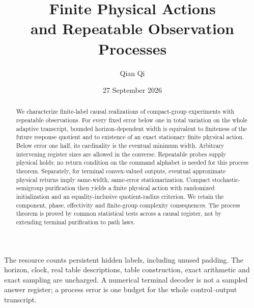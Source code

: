 \documentclass[11pt]{amsart}
\title[Finite actions and observation processes]{Finite Physical Actions\\and Repeatable Observation Processes}
\author{Qian Qi}
\date{27 September 2026}
\numberwithin{equation}{section}
\theoremstyle{definition}\newtheorem{definition}[theorem]{Definition}
\theoremstyle{remark}\newtheorem{remark}[theorem]{Remark}
\begin{document}
\begin{abstract}
We characterize finite-label causal realizations of compact-group
experiments with repeatable observations. For every fixed error below
one in total variation on the whole adaptive transcript, bounded
horizon-dependent width is equivalent to finiteness of the future
response quotient and to existence of an exact stationary finite
physical action. Below error one half, its cardinality is the eventual
minimum width. Arbitrary intervening register sizes are allowed in the
converse. Repeatable probes supply physical holds; no return condition
on the command alphabet is needed for this process theorem. Separately,
for terminal convex-valued outputs, eventual approximate physical
returns imply same-width, same-error stationarization. Compact
stochastic-semigroup purification then yields a finite physical action
with randomized initialization and an equality-inclusive quotient-radius
criterion. We retain the component, phase, effectivity and finite-group
complexity consequences. The process theorem is proved by common
statistical tests across a causal register, not by extending terminal
purification to path laws.
\end{abstract}
\maketitle
\noindent The resource counts persistent hidden labels, including unused
padding. The horizon, clock, real table descriptions, table construction,
exact arithmetic and exact sampling are uncharged. A numerical terminal
decoder is not a sampled answer register; a process error is one budget
for the whole control--output transcript.















\end{document}
